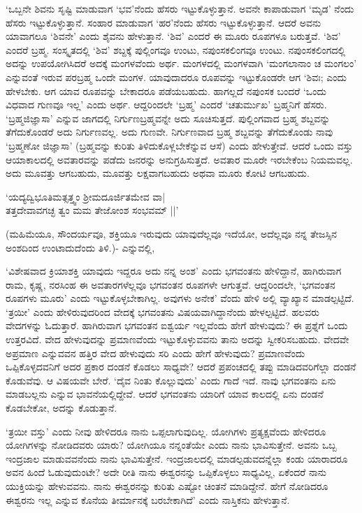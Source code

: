 `ಒಬ್ಬನೇ ಶಿವನು ಸೃಷ್ಟಿ ಮಾಡುವಾಗ `ಭವ'ನೆಂದು ಹೆಸರು ಇಟ್ಟುಕೊಳ್ಳುತ್ತಾನೆ. ಅವನೇ ಕಾಪಾಡುವಾಗ `ಮೃಡ' ನೆಂದು ಹೆಸರು ಇಟ್ಟುಕೊಳ್ಳುತ್ತಾನೆ. ಸಂಹಾರ ಮಾಡುವಾಗ `ಹರ'ನೆಂದು ಹೆಸರು ಇಟ್ಟುಕೊಳ್ಳುತ್ತಾನೆ. ಆದರೆ ಅವನು ಯಾವಾಗಲೂ `ಶಿವನೇ' ಎಂದು ಶೈವನು ಹೇಳುತ್ತಾನೆ. `ಶಿವ' ಎಂದರೆ ಈ ಮೂರು ರೂಪಗಳೂ ಬರುತ್ತವೆ. `ಶಿವ' ಎಂದರೆ ಬ್ರಹ್ಮ. ಸಂಸ್ಕೃತದಲ್ಲಿ `ಶಿವ' ಶಬ್ದಕ್ಕೆ ಪುಲ್ಲಿಂಗವೂ ಉಂಟು, ನಪುಂಸಕಲಿಂಗವೂ ಉಂಟು. ನಪುಂಸಕಲಿಂಗದಲ್ಲಿ ಅದನ್ನು ಉಪಯೋಗಿಸಿದರೆ ಅದಕ್ಕೆ ಮಂಗಳವೆಂದು ಅರ್ಥ. ಮಂಗಳದಲ್ಲಿ ಮಂಗಳವಾಗಿ `ಮಂಗಲಾನಾಂ ಚ ಮಂಗಲಂ' ಎನ್ನುವಂತೆ ಇರುವ ಪರಬ್ರಹ್ಮ ಒಂದೇ ಮಂಗಳ. ಯಾವುದಾದರೂ ರೂಪವನ್ನು ಇಟ್ಟುಕೊಂಡರೇ ಆಗ `ಶಿವಃ; ಎಂದು ಹೇಳಬೇಕು. ಆಗ ಯಾವ ರೂಪವನ್ನು ಬೇಕಾದರೂ ಪಡೆಯಬಹುದು. ಹಾಗಲ್ಲದೆ ನಪುಂಸಕ ಬಂದರೆ `ಒಂದು ವಿಧವಾದ ಗುಣವೂ ಇಲ್ಲ' ಎಂದು ಅರ್ಥ. ಆದ್ದರಿಂದಲೇ `ಬ್ರಹ್ಮ' ಎಂದರೆ `ಚತುರ್ಮುಖ' ಬ್ರಹ್ಮನಿಗೆ ಹೆಸರು. `ಬ್ರಹ್ಮಜಿಜ್ಞಾಸಾ' ಎನ್ನುವ ಜಾಗದಲ್ಲಿ ನಿರ್ಗುಣಬ್ರಹ್ಮವನ್ನೇ ಅದು ಸೂಚಿಸುತ್ತದೆ. ಪುಲ್ಲಿಂಗವಾದ ಬ್ರಹ್ಮ ಶಬ್ದವನ್ನು ತೆಗೆದುಕೊಂಡರೆ ಅದು ನಿರ್ಗುಣವಲ್ಲ. ಅದು ಗುಣವೇ. ನಿರ್ಗುಣವಾದ ಬ್ರಹ್ಮ ಶಬ್ದವನ್ನು ತೆಗೆದುಕೊಂಡು ನಾವು `ಬ್ರಹ್ಮಣೋ ಜಿಜ್ಞಾಸಾ' (ಬ್ರಹ್ಮವನ್ನು ಕುರಿತು ತಿಳಿದುಕೊಳ್ಲಬೇಕೆನ್ನುವ ಆಸೆ) ಎಂದು ಹೇಳುತ್ತೇವೆ. ಆದರೆ ಒಂದು ವಸ್ತು ಆಯಾಕಾಲದಲ್ಲಿ ಅವತಾರವನ್ನು ಪಡೆದು ಜನರನ್ನು ಅನುಗ್ರಹಿಸುತ್ತದೆ. ಅವತಾರ ಮೂರೇ ಇರಬೇಕೆಂಬ ನಿಯಮವಲ್ಲ. ಅದು ಮೂವತ್ತು ಆಗಬಹುದು, ಮೂವತ್ತು ಲಕ್ಷವಾಗಬಹುದು ಅಥವಾ ಮೂರು ಕೋಟಿ ಆಗಬಹುದು.

\begin{shloka}
`ಯದ್ಯದ್ವಿಭೂತಿಮತ್ಸತ್ತ್ವಂ ಶ್ರೀಮದೂರ್ಜಿತಮೇವ ವಾ‌|\\
ತತ್ತದೇವಾವಗಚ್ಛ ತ್ವಂ ಮಮ ತೇಜೋಂಶ ಸಂಭವಮ್ ||'
\end{shloka}

(ಮಹಿಮೆಯೂ, ಸೌಂದರ್ಯವೂ, ಶಕ್ತಿಯೂ ಇರುವುದು ಯಾವುದೆಲ್ಲವೂ ಇದೆಯೋ, ಅದೆಲ್ಲವೂ ನನ್ನ ತೇಜಸ್ಸಿನ ಅಂಶದಿಂದ ಉಂಟಾದುದೆಂದು ತಿಳಿ.)- ಎನ್ನುವಲ್ಲಿ,

`ವಿಶೇಷವಾದ ಕ್ರಿಯಾಶಕ್ತಿ ಯಾವುದು ಇದ್ದರೂ ಅದು ನನ್ನ ಅಂಶ' ಎಂದು ಭಗವಂತನು ಹೇಳಿದ್ದಾನೆ, ಹಾಗಿರುವಾಗ ರಾಮ, ಕೃಷ್ಣ, ನರಸಿಂಹ ಈ ಅವತಾರಗಳೆಲ್ಲವೂ ಭಗವಂತನ ರೂಪಗಳೇ ಆಗುತ್ತವೆ. ಆದ್ದರಿಂದಲೇ, `ಭಗವಂತನ ರೂಪಗಳು ಮೂರು' ಎಂದು ಇಟ್ಟುಕೊಳ್ಳಬೇಕಾಗಿಲ್ಲ. ಅವುಗಳು ಅನೇಕ' ವೆಂದು ಹೇಳಿ ಅಲ್ಲಿ ವ್ಯಾಖ್ಯಾನ ಮಾಡಲ್ಪಟ್ಟಿದೆ. `ತ್ರಯೀ' ಎಂದು ಹೇಳಿರುವುದರಿಂದ ವೇದಕ್ಕೆ ಭಗವಂತನು ವಿಷಯವಾಗಿದ್ದಾನೆಂದು ಹೇಳಲ್ಪಟ್ಟಿದೆ. ಹಲವರು ವೇದಗಳನ್ನು ಓದುತ್ತಾರೆ. ಹಾಗಿರುವಾಗ ಭಗವಂತನ ಐಶ್ವರ್ಯ ಇಲ್ಲವೆಂದು ಹೇಗೆ ಹೇಳುವುದು? ಈ ಪ್ರಶ್ನೆಗೆ ಒಂದು ಉತ್ತರವಿದೆ. ವೇದ ಹೇಳುವುದನ್ನು ಪ್ರಮಾಣವೆಂದು ಇಟ್ಟುಕೊಳ್ಳುವವನು ತಾನು ಅದನ್ನು  ಸ್ವೀಕರಿಸಬಹುದು. ವೇದವೇ ಅಪ್ರಮಾಣ ಎನ್ನುವವನ ಹತ್ತಿರ ವೇದ ಹೇಳುವುದು ಸರಿ ಎಂದು ಹೇಗೆ ಹೇಳುವುದು? ಪ್ರಮಾಣವೆಂದು ಒಪ್ಪಿಕೊಳ್ಳದವನಿಗೆ ಅದರ ಪ್ರಕಾರ ದಂಡನೆ ಕೊಡಲು ಸಾಧ್ಯವೇ? ಆದರೆ ಪ್ರಪಂಚದಲ್ಲಿ ತಪ್ಪು ಮಾಡಿದವರಿಗೆಲ್ಲಾ ದಂಡನೆ ಕೊಡುವೆವು. ಆ ವಿಷಯವೇ ಬೇರೆ. `ದೈವ ನಿಂತು ಕೊಲ್ಲುವುದು' ಎಂದು ಗಾದೆ ಇದೆ. ನಾವು ಭಗವಂತನು ಏನು ಮಾಡಬಲ್ಲನು ಎನ್ನುವ ಭಾವನೆಯಲ್ಲಿದ್ದೇವೆ. ಆದರೆ ಭಗವಂತನು ಯಾರಿಗೆ ಯಾವ ಕಾಲದಲ್ಲಿ ಏನು ದಂಡನೆ ಕೊಡಬೇಕೋ, ಅದನ್ನು ಕೊಡುತ್ತಾನೆ.

`ತ್ರಯೀ ವಸ್ತು' ಎಂದು ನೀವು ಹೇಳಿದರೂ ನಾನು ಒಪ್ಪಲಾಗುವುದಿಲ್ಲ. ಯೋಗಿಗಳು ಪ್ರತ್ಯಕ್ಷವೆಂದು ಹೇಳಿದರೂ ಯೋಗಿಗಳನ್ನು ನೋಡಿದವರು ಯಾರು? ಯೋಗಿಯೂ ನನ್ನಂತೆಯೇ ಎಂದು ನಾನು ಭಾವಿಸುತ್ತೇನೆ. ಅವನು ಒಬ್ಬ ಇಂದ್ರಜಾಲ ಮಾಡುವವನೆಂದು ನಾನು ಭಾವಿಸುತ್ತೇನೆ. ಇಂದ್ರಜಾಲದಲ್ಲಿ ಮಾಡಲ್ಪಡುವದನ್ನೆಲ್ಲಾ ಕಂಡು ಯಾರಾದರೂ ಅವನ ಹಿಂದೆ ಓಡುವುದುಂಟೇ? ಅದೇ ರೀತಿ ನಾನು ಈಶ್ವರನನ್ನು ಒಪ್ಪಿಕೊಳ್ಳಲು ಸಾಧ್ಯವಿಲ್ಲ, ಏಕೆಂದರೆ ನಾನು ಯುಕ್ತಿಯನ್ನು ಹೇಳುವವನು. ನಾನು ಈಶ್ವರನನ್ನು ಕುರಿತು ಎಷ್ಟೋ ಚಿಂತನೆ ಮಾಡಿದ್ದೇನೆ. ಹೇಗೆ ನೋಡಿದರೂ ಈಶ್ವರನು ಇಲ್ಲ ಎನ್ನುವ ಕೊನೆಯ ತೀರ್ಮಾನಕ್ಕೆ ಬರಬೇಕಾಗಿದೆ' ಎಂದು ನಾಸ್ತಿಕನು ಹೇಳುತ್ತಾನೆ.

